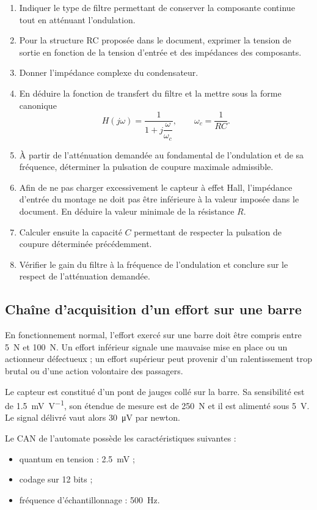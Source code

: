 \begin{enumerate}
  \item Indiquer le type de filtre permettant de conserver la composante continue tout en atténuant l'ondulation.
  \item Pour la structure RC proposée dans le document, exprimer la tension de sortie en fonction de la tension d'entrée et des impédances des composants.
  \item Donner l'impédance complexe du condensateur.
  \item En déduire la fonction de transfert du filtre et la mettre sous la forme canonique
  \[
    H(j\omega)=\frac{1}{1+j\dfrac{\omega}{\omega_c}},
    \qquad \omega_c=\frac{1}{RC}.
  \]
  \item À partir de l'atténuation demandée au fondamental de l'ondulation et de sa fréquence, déterminer la pulsation de coupure maximale admissible.
  \item Afin de ne pas charger excessivement le capteur à effet Hall, l'impédance d'entrée du montage ne doit pas être inférieure à la valeur imposée dans le document. En déduire la valeur minimale de la résistance $R$.
  \item Calculer ensuite la capacité $C$ permettant de respecter la pulsation de coupure déterminée précédemment.
  \item Vérifier le gain du filtre à la fréquence de l'ondulation et conclure sur le respect de l'atténuation demandée.
\end{enumerate}

\subsection{Chaîne d'acquisition d'un effort sur une barre}

En fonctionnement normal, l'effort exercé sur une barre doit être compris entre \SI{5}{\newton} et \SI{100}{\newton}. Un effort inférieur signale une mauvaise mise en place ou un actionneur défectueux ; un effort supérieur peut provenir d'un ralentissement trop brutal ou d'une action volontaire des passagers.

Le capteur est constitué d'un pont de jauges collé sur la barre. Sa sensibilité est de \SI{1.5}{\milli\volt\per\volt}, son étendue de mesure est de \SI{250}{\newton} et il est alimenté sous \SI{5}{\volt}. Le signal délivré vaut alors \SI{30}{\micro\volt} par newton.

Le CAN de l'automate possède les caractéristiques suivantes :
\begin{itemize}
  \item quantum en tension : \SI{2.5}{\milli\volt} ;
  \item codage sur 12 bits ;
  \item fréquence d'échantillonnage : \SI{500}{\hertz}.
\end{itemize}

